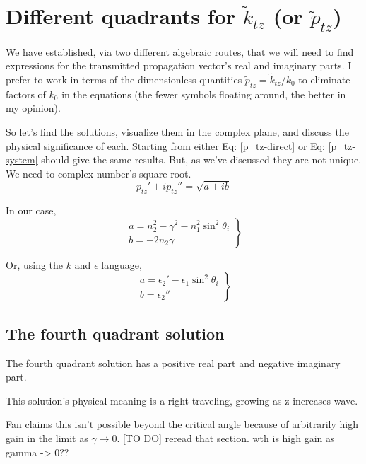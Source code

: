 \documentclass[10pt,a4paper]{article}
\begin{document}
\section{Different quadrants for $\tilde{k}_{tz}$ (or $\tilde{p}_{tz}$)}
We have established, via two different algebraic routes, that we will need to find expressions for the transmitted propagation vector's real and imaginary parts.  I prefer to work in terms of the dimensionless quantities $\tilde{p}_{tz}=\tilde{k}_{tz}/k_0$ to eliminate factors of $k_0$ in the equations (the fewer symbols floating around, the better in my opinion).

So let's find the solutions, visualize them in the complex plane, and discuss the physical significance of each.  Starting from either Eq: \ref{p_tz-direct} or Eq: \ref{p_tz-system} should give the same results. But, as we've discussed they are not unique. We need to complex number's square root.
\begin{equation}
p_{tz}'+ip_{tz}''=\sqrt{a+ib}
\end{equation}

In our case,
\begin{equation}
\left.
\begin{aligned}
a=n_2^2-\gamma^2-n_1^2\sin^2\theta_i \\
b=-2n_2\gamma \qquad
\end{aligned}
\right\}
\end{equation}

Or, using the $k$ and $\epsilon$ language,
\begin{equation}
\left.
\begin{aligned}
a=\epsilon_2'-\epsilon_1\sin^2\theta_i \\
b=\epsilon_2'' \qquad
\end{aligned}
\right\}
\end{equation}





\subsection{The fourth quadrant solution}
The fourth quadrant solution has a positive real part and negative imaginary part.

This solution's physical meaning is a right-traveling, growing-as-z-increases wave.

Fan claims this isn't possible beyond the critical angle because of arbitrarily high gain in the limit as $\gamma \to 0$. [TO DO] reread that section. wth is high gain as gamma -> 0??
\end{document}
